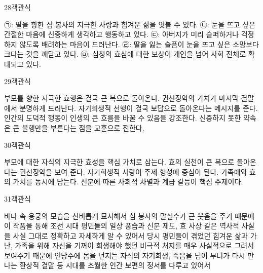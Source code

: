 \documentclass[fs9,seriesRus]{korfarm-base}
\begin{document}
\begin{kfQBlock}{28}{객관식}
\begin{kfChoices}
\kfChoice ㉠: 딸을 향한 심 봉사의 지극한 사랑과 힘겨운 삶을 엿볼 수 있다.
\kfChoice ㉡: 눈을 뜨고 싶은 간절한 마음에 신중하게 생각하고 행동하고 있다.
\kfChoice ㉢: 아버지가 미리 슬퍼하거나 걱정하지 않도록 배려하는 마음이 드러난다.
\kfChoice ㉣: 딸을 잃는 슬픔이 눈을 뜨고 싶은 소망보다 크다는 것을 깨닫고 있다.
\kfChoice ㉤: 심청의 효심에 대한 보상이 개인을 넘어 사회 전체로 확대되고 있다.
\end{kfChoices}
\end{kfQBlock}
\begin{kfQBlock}{29}{객관식}
\begin{kfChoices}
\kfChoice 부모를 향한 지극한 효행은 결국 큰 복으로 돌아온다.
\kfChoice 권선징악의 가치가 마지막 결말에서 분명하게 드러난다.
\kfChoice 자기희생적 선행이 결국 보답으로 돌아온다는 메시지를 준다.
\kfChoice 인간의 도덕적 행동이 인생의 큰 흐름을 바꿀 수 있음을 강조한다.
\kfChoice 신중하지 못한 약속은 큰 불행만을 부른다는 점을 교훈으로 전한다.
\end{kfChoices}
\end{kfQBlock}
\begin{kfQBlock}{30}{객관식}
\begin{kfChoices}
\kfChoice 부모에 대한 자식의 지극한 효성을 핵심 가치로 삼는다.
\kfChoice 효의 실천이 큰 복으로 돌아온다는 권선징악을 보여 준다.
\kfChoice 자기희생적 사랑이 주제 형성에 중심이 된다.
\kfChoice 가족애와 효의 가치를 동시에 담는다.
\kfChoice 신분에 따른 사회적 차별과 계급 갈등이 핵심 주제이다.
\end{kfChoices}
\end{kfQBlock}
\begin{kfQBlock}{31}{객관식}
\begin{kfChoices}
\kfChoice 바다 속 용궁의 모습을 신비롭게 묘사해서
\kfChoice 심 봉사의 말실수가 큰 웃음을 주기 때문에
\kfChoice 이 작품을 통해 조선 시대 평민들의 일상 풍습과 신분 제도, 효 사상 같은 역사적 사실을 사실 그대로 정확하고 자세하게 알 수 있어서
\kfChoice 당시 평민들이 겪었던 힘겨운 삶과 가난, 가족을 위해 자신을 기꺼이 희생해야 했던 비극적 처지를 매우 사실적으로 그려서 보여주기 때문에
\kfChoice 인당수에 몸을 던지는 자식의 자기희생, 죽음을 넘어 부녀가 다시 만나는 환상적 결말 등 시대를 초월한 인간 보편의 정서를 다루고 있어서
\end{kfChoices}
\end{kfQBlock}
\end{document}
